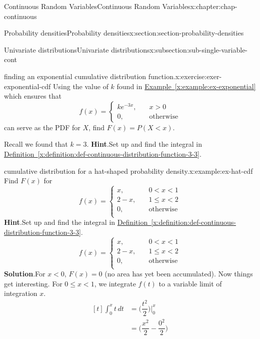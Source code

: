 \documentclass[oneside,10pt,]{book}
\newcommand{\blocktitlefont}{\relax}
\newcommand{\xreffont}{\relax}
\numberwithin{equation}{section}
\newcommand{\lt}{<}
\newcommand{\gt}{>}
\newcommand{\amp}{&}
\begin{document}
\begin{chapterptx}{Continuous Random Variables}{}{Continuous Random Variables}{}{}{x:chapter:chap-continuous}
\begin{sectionptx}{Probability densities}{}{Probability densities}{}{}{x:section:section-probability-densities}
\begin{subsectionptx}{Univariate distributions}{}{Univariate distributions}{}{}{x:subsection:sub-single-variable-cont}
\begin{inlineexercise}{finding an exponential cumulative distribution function.}{x:exercise:exer-exponential-cdf}
Using the value of \(k\) found in \hyperref[x:example:ex-exponential]{Example~{\xreffont\ref{x:example:ex-exponential}}} which ensures that%
\begin{equation*}
f(x) = \begin{cases}ke^{-3x},\amp \quad x \gt 0\\
0,
\amp \quad \text{otherwise}\end{cases}
\end{equation*}
can serve as the PDF for \(X\), find \(F(x) = P(X \lt x)\).%
\par
Recall we found that \(k=3\).%
\textbf{\blocktitlefont Hint}.\quad{}Set up and find the integral in \hyperref[x:definition:def-continuous-distribution-function-3-3]{Definition~{\xreffont\ref{x:definition:def-continuous-distribution-function-3-3}}}.%
\end{inlineexercise}
\begin{example}{cumulative distribution for a hat-shaped probability density.}{x:example:ex-hat-cdf}%
Find \(F(x)\) for%
\begin{equation*}
f(x) = \begin{cases}x,
\amp \quad 0 \lt x \lt 1\\
2-x, \amp \quad 1 \le x \lt 2\\
0, \amp \quad \text{otherwise}\\
\end{cases}
\end{equation*}
%
\textbf{\blocktitlefont Hint}.\quad{}Set up and find the integral in \hyperref[x:definition:def-continuous-distribution-function-3-3]{Definition~{\xreffont\ref{x:definition:def-continuous-distribution-function-3-3}}}.%
\begin{equation*}
f(x) = \begin{cases}
x, \amp \quad 0 \lt x \lt 1\\
2-x, \amp \quad 1 \le x \lt 2\\
0, \amp \quad \text{otherwise}\\
\end{cases}
\end{equation*}
%
\textbf{\blocktitlefont Solution}.\quad{}For \(x \lt 0\), \(F(x) = 0\) (no area has yet been accumulated). Now things get interesting.  For \(0 \le x \lt 1\), we integrate \(f(t)\) to a variable limit of integration \(x\).%
\begin{equation*}
\begin{aligned}[t]
\int_0^x t\,dt \amp = \Big(\dfrac{t^2}{2}\Big)\Big|_0^x\\
\amp = \Big(\dfrac{x^2}{2} - \dfrac{0^2}{2}\Big)\\

\end{aligned}
\end{equation*}
\end{example}
\end{subsectionptx}
\end{sectionptx}
\end{chapterptx}
\end{document}
